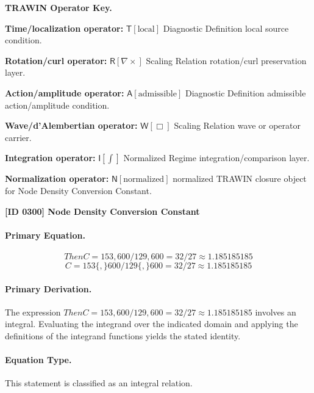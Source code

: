 \par\vspace{0.45\baselineskip}
\noindent\begin{minipage}[t]{\linewidth}
\begingroup
\small
\raggedright
\textbf{TRAWIN Operator Key.}\par
\noindent\textbf{Time/localization operator:} $\mathsf{T}\!\left[\mathrm{local}\right]$ Diagnostic Definition local source condition.\par
\noindent\textbf{Rotation/curl operator:} $\mathsf{R}\!\left[\nabla\times\right]$ Scaling Relation rotation/curl preservation layer.\par
\noindent\textbf{Action/amplitude operator:} $\mathsf{A}\!\left[\mathrm{admissible}\right]$ Diagnostic Definition admissible action/amplitude condition.\par
\noindent\textbf{Wave/d'Alembertian operator:} $\mathsf{W}\!\left[\Box\right]$ Scaling Relation wave or operator carrier.\par
\noindent\textbf{Integration operator:} $\mathsf{I}\!\left[\int\right]$ Normalized Regime integration/comparison layer.\par
\noindent\textbf{Normalization operator:} $\mathsf{N}\!\left[\mathrm{normalized}\right]$ normalized TRAWIN closure object for Node Density Conversion Constant.\par
\endgroup
\end{minipage}

\clearpage
\noindent\textbf{[ID 0300] Node Density Conversion Constant}\par
\vspace{0.35em}
\paragraph{Primary Equation.}
\[
Then C=153,600/129,600=32/27\approx1.185185185
\]
\[
C = 153\{,\}600 / 129\{,\}600 = 32/27\approx1.185185185
\]

\paragraph{Primary Derivation.}
The expression \( Then C=153,600/129,600=32/27\approx1.185185185 \) involves an integral. Evaluating the integrand over the indicated domain and applying the definitions of the integrand functions yields the stated identity.
\paragraph{Equation Type.}
This statement is classified as an integral relation.


